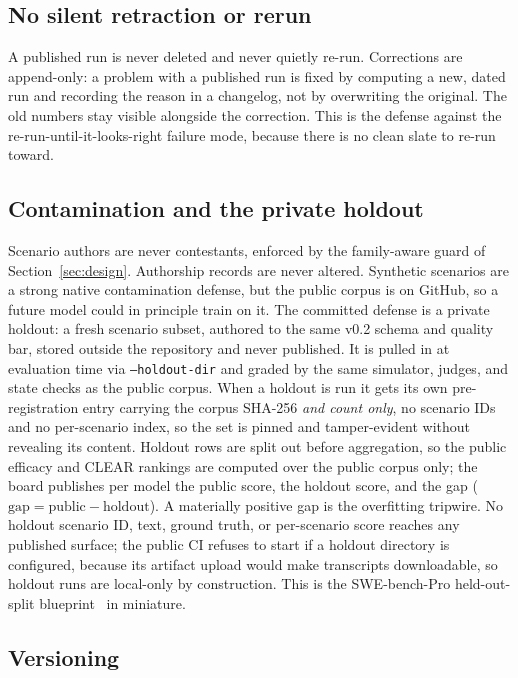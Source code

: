 \subsection{No silent retraction or rerun}

A published run is never deleted and never quietly re-run. Corrections are
append-only: a problem with a published run is fixed by computing a new, dated run
and recording the reason in a changelog, not by overwriting the original. The old
numbers stay visible alongside the correction. This is the defense against the
re-run-until-it-looks-right failure mode, because there is no clean slate to re-run
toward.

\subsection{Contamination and the private holdout}

Scenario authors are never contestants, enforced by the family-aware guard of
Section~\ref{sec:design}. Authorship records are never altered. Synthetic scenarios
are a strong native contamination defense, but the public corpus is on GitHub, so a
future model could in principle train on it. The committed defense is a private
holdout: a fresh scenario subset, authored to the same v0.2 schema and quality bar,
stored outside the repository and never published. It is pulled in at evaluation
time via \texttt{--holdout-dir} and graded by the same simulator, judges, and state
checks as the public corpus. When a holdout is run it gets its own
pre-registration entry carrying the corpus SHA-256 \emph{and count only}, no
scenario IDs and no per-scenario index, so the set is pinned and tamper-evident
without revealing its content. Holdout rows are split out before aggregation, so the
public efficacy and CLEAR rankings are computed over the public corpus only; the
board publishes per model the public score, the holdout score, and the gap
($\text{gap} = \text{public} - \text{holdout}$). A materially positive gap is the
overfitting tripwire. No holdout scenario ID, text, ground truth, or per-scenario
score reaches any published surface; the public CI refuses to start if a holdout
directory is configured, because its artifact upload would make transcripts
downloadable, so holdout runs are local-only by construction. This is the
SWE-bench-Pro held-out-split blueprint~\cite{swebenchpro2025} in miniature.

\subsection{Versioning}

